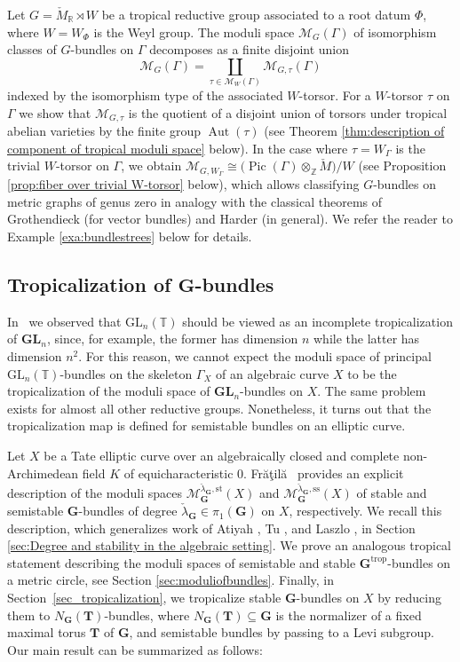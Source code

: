 \documentclass[10pt, a4paper]{amsart}
\theoremstyle{definition}
\theoremstyle{myitemstyle}
\newcommand{\R}{\mathbb{R}}
\newcommand{\Z}{\mathbb{Z}}
\newcommand{\TT}{\mathbb{T}}
\newcommand{\Mcheck}{{\check{M}}}
\newcommand{\lambdacheck}{\check{\lambda}}
\newcommand{\calM}{\mathcal{M}}
\newcommand{\bfG}{\mathbf{G}}
\newcommand{\bfT}{\mathbf{T}}
\newcommand{\mc}[1]{{\mathcal{#1}}}
\DeclareMathOperator{\Pic}{Pic}
\DeclareMathOperator{\Aut}{Aut}
\newcommand{\GL}{{\mathrm{GL}}}
\newcommand{\trop}{{\mathrm{trop}}}
\newcommand{\Ga}{\Gamma}
\newcommand{\Fratila}{Fr{\u{a}}{\c{t}}il{\u{a}}}
\begin{document}
Let $G=\Mcheck_\R\rtimes W$ be a tropical reductive group associated to a root datum $\Phi$, where $W = W_\Phi$ is the Weyl group. The moduli space $\calM_G(\Ga)$ of isomorphism classes of $G$-bundles on $\Ga$ decomposes as a finite disjoint union 
\[
\calM_G(\Ga)=\coprod_{\tau\in \calM_{W}(\Ga)}\calM_{G,\tau}(\Ga)
\]
indexed by the isomorphism type of the associated $W$-torsor. For a $W$-torsor $\tau$ on $\Gamma$ we show that $\mc M_{G,\tau}$ is the quotient of a disjoint union of torsors under tropical abelian varieties by the finite group $\Aut(\tau)$ (see Theorem \ref{thm:description of component of tropical moduli space} below). In the case where $\tau = W_{\Ga}$ is the trivial $W$-torsor on $\Ga$, we obtain $\mc M_{G,W_\Gamma} \cong \big(\Pic(\Gamma)\otimes_\Z \Mcheck\big)/W$ (see Proposition \ref{prop:fiber over trivial W-torsor} below), which allows classifying $G$-bundles on metric graphs of genus zero in analogy with the classical theorems of Grothendieck \cite{Grothendieck_vectorbundlesonP1} (for vector bundles) and Harder \cite{1968Harder} (in general). We refer the reader to Example \ref{exa:bundlestrees} below for details. 

\subsection*{Tropicalization of $\bfG$-bundles} In~\cite{2022GrossUlirschZakharov} we observed that $\GL_n(\TT)$ should be viewed as an incomplete tropicalization of $\mathbf{GL}_n$, since, for example, the former has dimension $n$ while the latter has dimension $n^2$. For this reason, we cannot expect the moduli space of principal $\GL_n(\TT)$-bundles on the skeleton $\Gamma_X$ of an algebraic curve $X$ to be the tropicalization of the moduli space of $\mathbf{GL}_n$-bundles on $X$. The same problem exists for almost all other reductive groups. Nonetheless, it turns out that the tropicalization map is defined for semistable bundles on an elliptic curve. 



Let $X$ be a Tate elliptic curve over an algebraically closed and complete non-Archimedean field $K$ of equicharacteristic $0$. \Fratila~  \cite{fratila2016stack,Fratila_revisitingelliptic} provides an explicit description of the moduli spaces $\mc M_\mathbf{G}^{\lambdacheck_\mathbf{G},\mathrm{st}}(X)$ and $\mc M_\mathbf{G}^{\lambdacheck_\mathbf{G},\mathrm{ss}}(X)$ of stable and semistable $\mathbf{G}$-bundles of degree $\lambdacheck_\bfG \in \pi_1(\bfG)$ on $X$, respectively. We recall this description, which generalizes work of Atiyah \cite{Atiyah_ellipticvectorbundles}, Tu \cite{Tu_semistablebundles}, and Laszlo \cite{Laszlo_elliptic}, in Section \ref{sec:Degree and stability in the algebraic setting}. We prove an analogous tropical statement describing the moduli spaces of semistable and stable $\bfG^\trop$-bundles on a metric circle, see Section \ref{sec:moduliofbundles}. Finally, in Section~\ref{sec_tropicalization}, we tropicalize stable $\bfG$-bundles on $X$ by reducing them to $N_\bfG(\bfT)$-bundles, where $N_\bfG(\bfT) \subseteq \bfG$ is the normalizer of a fixed maximal torus $\bfT$ of $\bfG$, and semistable bundles by passing to a Levi subgroup. Our main result can be summarized as follows:
\end{document}
